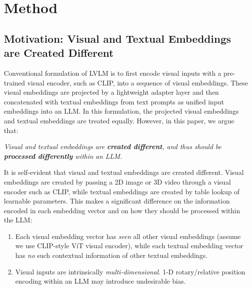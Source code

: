 \section{Method}

\subsection{Motivation: Visual and Textual Embeddings are Created Different}\label{sec:method:motivation}

Conventional formulation of LVLM is to first encode visual inputs with a pre-trained visual encoder, such as CLIP, into a sequence of visual embeddings.
These visual embeddings are projected by a lightweight adapter layer and then concatenated with textual embeddings from text prompts as unified input embeddings into an LLM.
In this formulation, the projected visual embeddings and textual embeddings are treated equally.
However, in this paper, we argue that:

\textit{Visual and textual embeddings are \textbf{created different}, and thus should be \textbf{processed differently} within an LLM.}

It is self-evident that visual and textual embeddings are created different.
Visual embeddings are created by passing a 2D image or 3D video through a visual encoder such as CLIP, while textual embeddings are created by table lookup of learnable parameters.
This makes a significant difference on the information encoded in each embedding vector and on how they should be processed within the LLM:
\begin{enumerate}[wide,labelindent=0pt]
\item \label{enum:ctx} Each visual embedding vector has \emph{seen} all other visual embeddings (assume we use CLIP-style ViT visual encoder), while each textual embedding vector has \emph{no} such contextual information of other textual embeddings.
\item \label{enum:pos} Visual inputs are intrinsically \emph{multi-dimensional}. 1-D rotary/relative position encoding within an LLM may introduce undesirable bias.
\end{enumerate}

